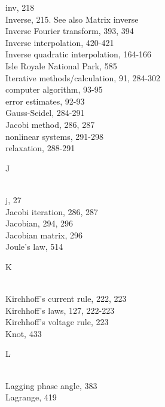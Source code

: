 \documentclass[../main.tex]{subfiles}
\begin{document}
\begin{multicols}{3}
    inv, 218\\
    Inverse, 215. See also Matrix inverse\\
    Inverse Fourier transform, 393, 394\\
    Inverse interpolation, 420-421\\
    Inverse quadratic interpolation, 164-166\\
    Isle Royale National Park, 585\\
    Iterative methods/calculation, 91, 284-302\\
    \hspace*{3mm}computer algorithm, 93-95\\
    \hspace*{3mm}error estimates, 92-93\\
    \hspace*{3mm}Gauss-Seidel, 284-291\\
    \hspace*{3mm}Jacobi method, 286, 287\\
    \hspace*{3mm}nonlinear systems, 291-298\\
    \hspace*{3mm}relaxation, 288-291\vspace*{2mm}\\
    \begin{huge} J \end{huge}\\
    j, 27\\
    Jacobi iteration, 286, 287\\
    Jacobian, 294, 296\\
    Jacobian matrix, 296\\
    Joule's law, 514\vspace*{2mm}\\
    \begin{huge} K \end{huge}\\
    Kirchhoff's current rule, 222, 223\\
    Kirchhoff's laws, 127, 222-223\\
    Kirchhoff's voltage rule, 223\\
    Knot, 433\vspace*{2mm}\\
    \begin{huge} L \end{huge}\\
    Lagging phase angle, 383\\
    Lagrange, 419\\

\end{multicols}
\end{document}
